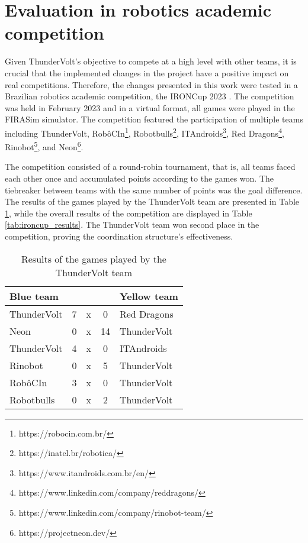 \section{Evaluation in robotics academic competition}

Given ThunderVolt's objective to compete at a high level with other teams, it is crucial that the implemented changes in the project have a positive impact on real competitions. Therefore, the changes presented in this work were tested in a Brazilian robotics academic competition, the IRONCup 2023 \cite{IRONCup2023}. The competition was held in February 2023 and in a virtual format, all games were played in the FIRASim simulator. The competition featured the participation of multiple teams including ThunderVolt, RobôCIn\footnote{https://robocin.com.br/}, Robotbulls\footnote{https://inatel.br/robotica/}, ITAndroids\footnote{https://www.itandroids.com.br/en/}, Red Dragons\footnote{https://www.linkedin.com/company/reddragons/}, Rinobot\footnote{https://www.linkedin.com/company/rinobot-team/}, and Neon\footnote{https://projectneon.dev/}.

The competition consisted of a round-robin tournament, that is, all teams faced each other once and accumulated points according to the games won. The tiebreaker between teams with the same number of points was the goal difference. The results of the games played by the ThunderVolt team are presented in Table \ref{tab:ironcup_games}, while the overall results of the competition are displayed in Table  \ref{tab:ironcup_results}. The ThunderVolt team won second place in the competition, proving the coordination structure's effectiveness.

\begin{table}[h]
    \centering
    \begin{tabular}{l c c c l}
        \toprule
        Blue team   &   &   &    & Yellow team \\
        \midrule
        ThunderVolt & 7 & x & 0  & Red Dragons \\
        Neon        & 0 & x & 14 & ThunderVolt \\
        ThunderVolt & 4 & x & 0  & ITAndroids  \\
        Rinobot     & 0 & x & 5  & ThunderVolt \\
        RobôCIn     & 3 & x & 0  & ThunderVolt \\
        Robotbulls  & 0 & x & 2  & ThunderVolt \\
        \bottomrule
    \end{tabular}
    \caption{Results of the games played by the ThunderVolt team \cite{ResultsIRONCup2023}}
    \label{tab:ironcup_games}
\end{table}

